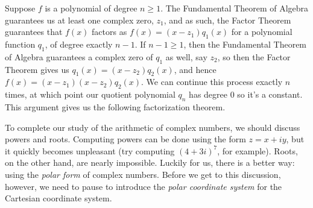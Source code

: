 \smallskip

Suppose  $f$ is a polynomial of degree $n \geq 1$.  The Fundamental Theorem of Algebra guarantees us at least one complex zero, $z_{1}$, and as such, the Factor Theorem guarantees that $f(x)$ factors as $f(x) = \left(x - z_{1}\right) q_{1}(x)$ for a polynomial function $q_{1}$,  of degree exactly $n-1$.  If $n-1 \geq 1$, then the Fundamental Theorem of Algebra guarantees a complex zero of $q_{1}$ as well, say $z_{2}$, so then the Factor Theorem gives us $q_{1}(x) = \left(x - z_{2}\right) q_{2}(x)$, and hence $f(x) = \left(x - z_{1}\right) \left(x - z_{2}\right) q_{2}(x)$.  We can continue this process exactly $n$ times, at which point our quotient polynomial $q_{n}$ has degree $0$ so it's a constant.  This argument gives us the following factorization theorem.

\smallskip


\smallskip

To complete our study of the arithmetic of complex numbers, we should discuss powers and roots. Computing powers can be done using the form $z=x+iy$, but it quickly becomes unpleasant (try computing $(4+3i)^7$, for example). Roots, on the other hand, are nearly impossible. Luckily for us, there is a better way: using the \textit{polar form} of complex numbers. Before we get to this discussion, however, we need to pause to introduce the \textit{polar coordinate system} for the Cartesian coordinate system.

